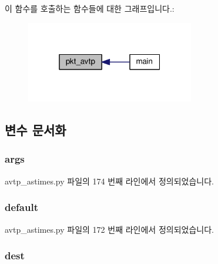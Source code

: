이 함수를 호출하는 함수들에 대한 그래프입니다.\+:
\nopagebreak
\begin{figure}[H]
\begin{center}
\leavevmode
\includegraphics[width=208pt]{namespaceavtp__astimes_a71c89e27ea4d1ec1581b04e71cdb6ae2_icgraph}
\end{center}
\end{figure}




\subsection{변수 문서화}
\subsubsection[{\texorpdfstring{args}{args}}]{\setlength{\rightskip}{0pt plus 5cm}args}\hypertarget{namespaceavtp__astimes_a8187411843a6284ffb964ef3fb9fcab3}{}\label{namespaceavtp__astimes_a8187411843a6284ffb964ef3fb9fcab3}


avtp\+\_\+astimes.\+py 파일의 174 번째 라인에서 정의되었습니다.

\subsubsection[{\texorpdfstring{default}{default}}]{\setlength{\rightskip}{0pt plus 5cm}default}\hypertarget{namespaceavtp__astimes_affb1327b18bf08a379d19eef89cf1ed1}{}\label{namespaceavtp__astimes_affb1327b18bf08a379d19eef89cf1ed1}


avtp\+\_\+astimes.\+py 파일의 172 번째 라인에서 정의되었습니다.

\subsubsection[{\texorpdfstring{dest}{dest}}]{\setlength{\rightskip}{0pt plus 5cm}dest}\hypertarget{namespaceavtp__astimes_ab0bede79c5f4cbed9c2cd932a0ace201}{}\label{namespaceavtp__astimes_ab0bede79c5f4cbed9c2cd932a0ace201}


